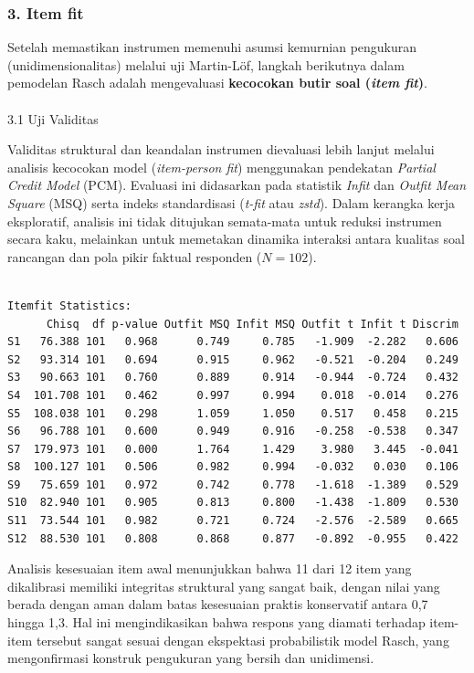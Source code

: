 \documentclass[
]{article}
\makeatletter
\let\oldparagraph\paragraph
\renewcommand{\paragraph}{
    \@ifstar
      \xxxParagraphStar
      \xxxParagraphNoStar
  }
\newcommand{\xxxParagraphStar}[1]{\oldparagraph*{#1}\mbox{}}
\newcommand{\xxxParagraphNoStar}[1]{\oldparagraph{#1}\mbox{}}
\makeatother
\begin{document}
\subsubsection{3. Item fit}\label{item-fit}

Setelah memastikan instrumen memenuhi asumsi kemurnian pengukuran
(unidimensionalitas) melalui uji Martin-Löf, langkah berikutnya dalam
pemodelan Rasch adalah mengevaluasi \textbf{kecocokan butir soal
(\emph{item fit})}.

\paragraph{3.1 Uji Validitas}\label{uji-validitas}

Validitas struktural dan keandalan instrumen dievaluasi lebih lanjut
melalui analisis kecocokan model (\emph{item-person fit}) menggunakan
pendekatan \emph{Partial Credit Model} (PCM). Evaluasi ini didasarkan
pada statistik \emph{Infit} dan \emph{Outfit Mean Square} (MSQ) serta
indeks standardisasi (\emph{t-fit} atau \emph{zstd}). Dalam kerangka
kerja eksploratif, analisis ini tidak ditujukan semata-mata untuk
reduksi instrumen secara kaku, melainkan untuk memetakan dinamika
interaksi antara kualitas soal rancangan dan pola pikir faktual
responden (\(N = 102\)).

\begin{verbatim}

Itemfit Statistics: 
      Chisq  df p-value Outfit MSQ Infit MSQ Outfit t Infit t Discrim
S1   76.388 101   0.968      0.749     0.785   -1.909  -2.282   0.606
S2   93.314 101   0.694      0.915     0.962   -0.521  -0.204   0.249
S3   90.663 101   0.760      0.889     0.914   -0.944  -0.724   0.432
S4  101.708 101   0.462      0.997     0.994    0.018  -0.014   0.276
S5  108.038 101   0.298      1.059     1.050    0.517   0.458   0.215
S6   96.788 101   0.600      0.949     0.916   -0.258  -0.538   0.347
S7  179.973 101   0.000      1.764     1.429    3.980   3.445  -0.041
S8  100.127 101   0.506      0.982     0.994   -0.032   0.030   0.106
S9   75.659 101   0.972      0.742     0.778   -1.618  -1.389   0.529
S10  82.940 101   0.905      0.813     0.800   -1.438  -1.809   0.530
S11  73.544 101   0.982      0.721     0.724   -2.576  -2.589   0.665
S12  88.530 101   0.808      0.868     0.877   -0.892  -0.955   0.422
\end{verbatim}

Analisis kesesuaian item awal menunjukkan bahwa 11 dari 12 item yang
dikalibrasi memiliki integritas struktural yang sangat baik, dengan
nilai yang berada dengan aman dalam batas kesesuaian praktis konservatif
antara 0,7 hingga 1,3. Hal ini mengindikasikan bahwa respons yang
diamati terhadap item-item tersebut sangat sesuai dengan ekspektasi
probabilistik model Rasch, yang mengonfirmasi konstruk pengukuran yang
bersih dan unidimensi.
\end{document}
